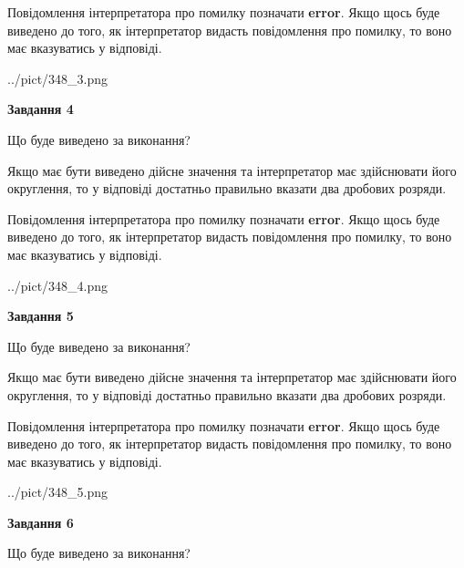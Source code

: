 \documentclass[12pt, ukrainian]{article}
\begin{document}
{\begin {Large}
Повідомлення інтерпретатора про помилку позначати \textbf{error}.
Якщо щось буде виведено до того, як інтерпретатор видасть повідомлення про помилку, 
то воно має вказуватись у відповіді. \par

\begin{center}
	{../pict/348_3.png}
\end{center}
\newpage

{\begin {center}\textbf{Завдання 4}\end {center}}\par
Що буде виведено за виконання? \par

Якщо має бути виведено дійсне значення та інтерпретатор має здійснювати його округлення, 
то у відповіді достатньо правильно вказати два дробових розряди.

Повідомлення інтерпретатора про помилку позначати \textbf{error}.
Якщо щось буде виведено до того, як інтерпретатор видасть повідомлення про помилку, 
то воно має вказуватись у відповіді. \par

\begin{center}
	{../pict/348_4.png}
\end{center}
\newpage

{\begin {center}\textbf{Завдання 5}\end {center}}\par
Що буде виведено за виконання? \par

Якщо має бути виведено дійсне значення та інтерпретатор має здійснювати його округлення, 
то у відповіді достатньо правильно вказати два дробових розряди.

Повідомлення інтерпретатора про помилку позначати \textbf{error}.
Якщо щось буде виведено до того, як інтерпретатор видасть повідомлення про помилку, 
то воно має вказуватись у відповіді. \par

\begin{center}
	{../pict/348_5.png}
\end{center}
\newpage

{\begin {center}\textbf{Завдання 6}\end {center}}\par
Що буде виведено за виконання? \par


\end{Large}}
\end{document}
